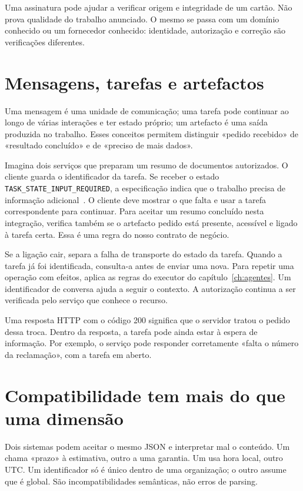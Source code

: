 Uma assinatura pode ajudar a verificar origem e integridade de um cartão. Não prova qualidade do trabalho anunciado. O mesmo se passa com um domínio conhecido ou um fornecedor conhecido: identidade, autorização e correção são verificações diferentes.

\section{Mensagens, tarefas e artefactos}
Uma mensagem é uma unidade de comunicação; uma tarefa pode continuar ao longo de várias interações e ter estado próprio; um artefacto é uma saída produzida no trabalho. Esses conceitos permitem distinguir «pedido recebido» de «resultado concluído» e de «preciso de mais dados».

Imagina dois serviços que preparam um resumo de documentos autorizados. O cliente guarda o identificador da tarefa. Se receber o estado \nolinkurl{TASK_STATE_INPUT_REQUIRED}, a especificação indica que o trabalho precisa de informação adicional~\citep{a2a2026}. O cliente deve mostrar o que falta e usar a tarefa correspondente para continuar. Para aceitar um resumo concluído nesta integração, verifica também se o artefacto pedido está presente, acessível e ligado à tarefa certa. Essa é uma regra do nosso contrato de negócio.

Se a ligação cair, separa a falha de transporte do estado da tarefa. Quando a tarefa já foi identificada, consulta-a antes de enviar uma nova. Para repetir uma operação com efeitos, aplica as regras do executor do capítulo~\ref{ch:agentes}. Um identificador de conversa ajuda a seguir o contexto. A autorização continua a ser verificada pelo serviço que conhece o recurso.

Uma resposta HTTP com o código 200 significa que o servidor tratou o pedido dessa troca. Dentro da resposta, a tarefa pode ainda estar à espera de informação. Por exemplo, o serviço pode responder corretamente «falta o número da reclamação», com a tarefa em aberto.

\section{Compatibilidade tem mais do que uma dimensão}
Dois sistemas podem aceitar o mesmo JSON e interpretar mal o conteúdo. Um chama «prazo» à estimativa, outro a uma garantia. Um usa hora local, outro UTC. Um identificador só é único dentro de uma organização; o outro assume que é global. São incompatibilidades semânticas, não erros de parsing.

